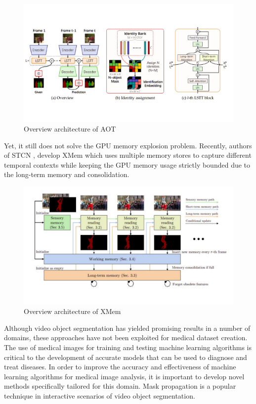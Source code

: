 \begin{figure}[!h]
    \centering
    \includegraphics[width=\textwidth]{content/resources/new_images/models/aot.pdf}
    \caption{Overview architecture of AOT \cite{yang2022associating}}
    \label{fig:aot}
\end{figure}

Yet, it still does not solve the GPU memory explosion problem. Recently, authors of STCN \cite{cheng2021stcn}, develop XMem \cite{cheng2022xmem} which uses multiple memory stores to capture different temporal contexts while keeping the GPU memory     usage strictly bounded due to the long-term memory and consolidation.

\begin{figure}[!h]
    \centering
    \includegraphics[width=\textwidth]{content/resources/new_images/models/xmem.pdf}
    \caption{Overview architecture of XMem \cite{cheng2022xmem}}
    \label{fig:xmem}
\end{figure}


Although video object segmentation has yielded promising results in a number of domains, these approaches have not been exploited for medical dataset creation. The use of medical images for training and testing machine learning algorithms is critical to the development of accurate models that can be used to diagnose and treat diseases. In order to improve the accuracy and effectiveness of machine learning algorithms for medical image analysis, it is important to develop novel methods specifically tailored for this domain. Mask propagation is a popular technique in interactive scenarios of video object segmentation. 

